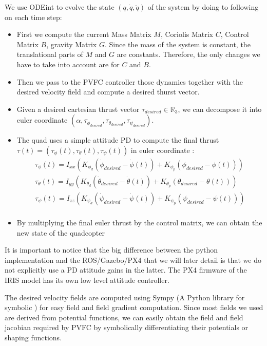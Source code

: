 We use ODEint to evolve the state $(q,\dot{q}, \ddot{q})$ of the system by doing to following on each time step: 
\begin{itemize}
    \item First we compute the current Mass Matrix $M$, Coriolis Matrix $C$, Control Matrix $B$, gravity Matrix $G$. Since the mass of the system is constant, the translational parts of $M$ and $G$ are constants.
    Therefore, the only changes we have to take into account are for $C$ and $B$.
    \item Then we pass to the PVFC controller those dynamics together with the desired velocity field and compute a desired thurst vector.
    \item Given a desired cartesian thrust vector $\tau_{desired} \in \mathbb{R}_3$, we can decompose it into euler coordinate $(\alpha, \tau_{\phi_{desired}}, \tau_{\theta_{desired}}, \tau_{\psi_{desired}})$. 
    \item The quad uses a simple attitude PD to compute the final thrust $\tau(t) = (\tau_{{\phi}}(t), \tau_{{\theta}}(t), \tau_{{\psi}}(t)) $ in euler coordinate :
    \begin{align}
        \tau_{{\phi}}(t) = I_{xx}(K_{\phi_{d}}(\dot{\phi}_{desired} - \dot{\phi}(t))+K_{\phi_{p}}(\phi_{desired} - \phi(t)))\\ \nonumber
        \tau_{{\theta}}(t) = I_{yy}(K_{\theta_{d}}(\dot{\theta}_{desired} - \dot{\theta}(t))+K_{\theta_{p}}(\theta_{desired} - \theta(t)))\\ \nonumber
        \tau_{{\psi}}(t) = I_{zz}(K_{\psi_{d}}(\dot{\psi}_{desired} - \dot{\psi}(t))+K_{\psi_{p}}(\psi_{desired} - \psi(t)))\\ \nonumber
    \end{align}
    \item By multiplying the final euler thrust by the control matrix, we can obtain the new state of the quadcopter
\end{itemize}
It is important to notice that the big difference between the python implementation and the ROS/Gazebo/PX4 that we will later detail is that we do not explicitly use a PD attitude gains in the latter. 
The PX4 firmware of the IRIS model has its own low level attitude controller.


The desired velocity fields are computed using Sympy (A Python library for symbolic ) for easy field and field gradient computation. Since most fields we used are derived from potential functions, we can easily obtain the field and field jacobian required by PVFC by symbolically differentiating their potentials or shaping functions.

